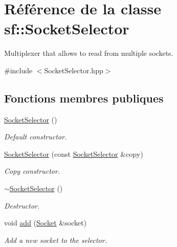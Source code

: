 \hypertarget{classsf_1_1SocketSelector}{}\section{Référence de la classe sf\+:\+:Socket\+Selector}
\label{classsf_1_1SocketSelector}


Multiplexer that allows to read from multiple sockets.  




{\ttfamily \#include $<$Socket\+Selector.\+hpp$>$}

\subsection*{Fonctions membres publiques}
\begin{DoxyCompactItemize}
\item 
\mbox{\label{classsf_1_1SocketSelector_a741959c5158aeb1e4457cad47d90f76b}} 
\hyperlink{classsf_1_1SocketSelector_a741959c5158aeb1e4457cad47d90f76b}{Socket\+Selector} ()
\begin{DoxyCompactList}\small\item\em Default constructor. \end{DoxyCompactList}\item 
\hyperlink{classsf_1_1SocketSelector_a50b1b955eb7ecb2e7c2764f3f4722fbf}{Socket\+Selector} (const \hyperlink{classsf_1_1SocketSelector}{Socket\+Selector} \&copy)
\begin{DoxyCompactList}\small\item\em Copy constructor. \end{DoxyCompactList}\item 
\mbox{\label{classsf_1_1SocketSelector_a9069cd61208260b8ed9cf233afa1f73d}} 
\hyperlink{classsf_1_1SocketSelector_a9069cd61208260b8ed9cf233afa1f73d}{$\sim$\+Socket\+Selector} ()
\begin{DoxyCompactList}\small\item\em Destructor. \end{DoxyCompactList}\item 
void \hyperlink{classsf_1_1SocketSelector_ade952013232802ff7b9b33668f8d2096}{add} (\hyperlink{classsf_1_1Socket}{Socket} \&socket)
\begin{DoxyCompactList}\small\item\em Add a new socket to the selector. \end{DoxyCompactList}\item 

\end{DoxyCompactItemize}
